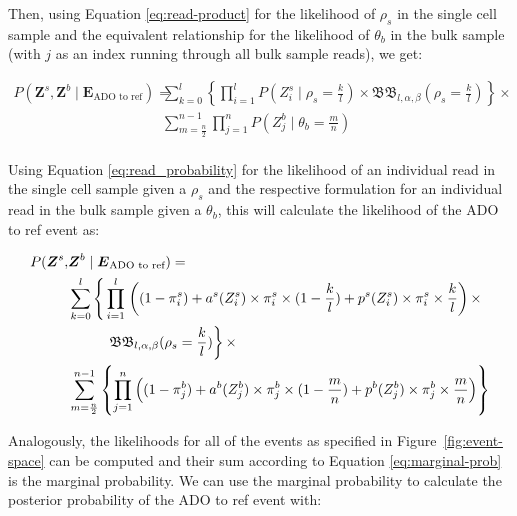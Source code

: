 \documentclass[authoryear,preprint,11pt]{scrartcl}
\newcommand{\Prob}{{P}}
\newcommand{\cB}{{\mathfrak B}}
\begin{document}
Then, using Equation \ref{eq:read-product} for the likelihood of $\rho_s$ in the single cell sample and the equivalent relationship for the likelihood of $\theta_b$ in the bulk sample (with $j$ as an index running through all bulk sample reads), we get:

\begin{equation}
  \label{eq:ado-to-ref-likelihood-reads}
  \begin{split}
    \Prob(\boldsymbol{Z}^s,\boldsymbol{Z}^b \mid \boldsymbol{E}_{\text{ADO to ref}})
      =~&\sum_{k=0}^{l} \left\{ \prod_{i=1}^{l} \Prob(Z_i^s \mid \rho_s = \frac{k}{l}) \times \cB\cB_{l,\alpha, \beta} (\rho_s = \frac{k}{l}) \right\} \times\\
        &\sum_{m=\frac{n}{2}}^{n-1} \prod_{j=1}^{n} \Prob(Z_j^b \mid \theta_b = \frac{m}{n})\\
  \end{split}    
\end{equation}

Using Equation \ref{eq:read_probability} for the likelihood of an individual read in the single cell sample given a $\rho_s$ and the respective formulation for an individual read in the bulk sample given a $\theta_b$, this will calculate the likelihood of the {\ttfamily ADO to ref} event as:

\begin{equation}
  \begin{split}
  \label{eq:ado-to-ref-likelihood-data}
    \Prob(\boldsymbol{Z}^s,&\boldsymbol{Z}^b \mid \boldsymbol{E}_{\text{ADO to ref}}) =\\
    &\sum_{k=0}^{l} \left\{\vphantom{\prod_{i}{l}} \prod_{i=1}^{l} \right.\left( (1 - \pi_i^s) + a^s(Z_i^s)\times \pi_i^s \times (1 - \frac{k}{l}) + p^s(Z_i^s) \times \pi_i^s \times \frac{k}{l} \right) \times \\
    &\qquad~~\left.\cB\cB_{l,\alpha, \beta} (\rho_s = \frac{k}{l}) \right\} \times\\
    &\sum_{m=\frac{n}{2}}^{n-1} \left\{ \prod_{j=1}^{n} \left( (1 - \pi_j^b) + a^b(Z_j^b)\times \pi_j^b \times (1 - \frac{m}{n}) + p^b(Z_j^b) \times \pi_j^b \times \frac{m}{n} \right) \right\}\\
  \end{split}
\end{equation}

Analogously, the likelihoods for all of the events as specified in Figure~\ref{fig:event-space} can be computed and their sum according to Equation \ref{eq:marginal-prob} is the marginal probability.
We can use the marginal probability to calculate the posterior probability of the {\ttfamily ADO to ref} event with:
\end{document}
